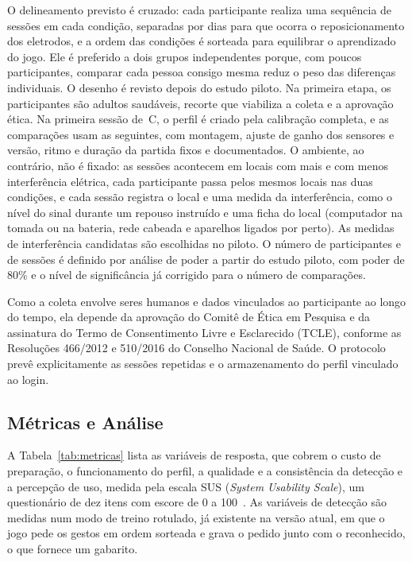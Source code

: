 \documentclass[runningheads]{llncs}
\begin{document}
O delineamento previsto é cruzado: cada participante realiza uma sequência de sessões em cada condição, separadas por dias para que ocorra o reposicionamento dos eletrodos, e a ordem das condições é sorteada para equilibrar o aprendizado do jogo. Ele é preferido a dois grupos independentes porque, com poucos participantes, comparar cada pessoa consigo mesma reduz o peso das diferenças individuais. O desenho é revisto depois do estudo piloto. Na primeira etapa, os participantes são adultos saudáveis, recorte que viabiliza a coleta e a aprovação ética. Na primeira sessão de~C, o perfil é criado pela calibração completa, e as comparações usam as seguintes, com montagem, ajuste de ganho dos sensores e versão, ritmo e duração da partida fixos e documentados. O ambiente, ao contrário, não é fixado: as sessões acontecem em locais com mais e com menos interferência elétrica, cada participante passa pelos mesmos locais nas duas condições, e cada sessão registra o local e uma medida da interferência, como o nível do sinal durante um repouso instruído e uma ficha do local (computador na tomada ou na bateria, rede cabeada e aparelhos ligados por perto). As medidas de interferência candidatas são escolhidas no piloto. O número de participantes e de sessões é definido por análise de poder a partir do estudo piloto, com poder de 80\% e o nível de significância já corrigido para o número de comparações.

Como a coleta envolve seres humanos e dados vinculados ao participante ao longo do tempo, ela depende da aprovação do Comitê de Ética em Pesquisa e da assinatura do Termo de Consentimento Livre e Esclarecido (TCLE), conforme as Resoluções 466/2012 e 510/2016 do Conselho Nacional de Saúde. O protocolo prevê explicitamente as sessões repetidas e o armazenamento do perfil vinculado ao login.

\subsection{Métricas e Análise}

A Tabela~\ref{tab:metricas} lista as variáveis de resposta, que cobrem o custo de preparação, o funcionamento do perfil, a qualidade e a consistência da detecção e a percepção de uso, medida pela escala SUS (\textit{System Usability Scale}), um questionário de dez itens com escore de 0 a 100~\citep{bangor2008sus}. As variáveis de detecção são medidas num modo de treino rotulado, já existente na versão atual, em que o jogo pede os gestos em ordem sorteada e grava o pedido junto com o reconhecido, o que fornece um gabarito.
\end{document}
